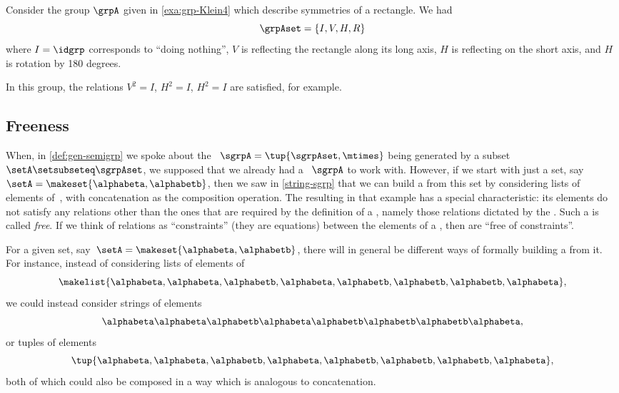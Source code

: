 \begin{example}
    Consider the group $\grpA$ given in \cref{exa:grp-Klein4} which describe symmetries of a rectangle.
    We had
    \begin{equation}
        \grpAset = \{ I, V, H, R\}
    \end{equation}
    where $I = \idgrp$ corresponds to ``doing nothing'', $V$ is reflecting the rectangle along its long axis, $H$ is reflecting on the short axis, and $H$ is rotation by 180 degrees.

    In this group, the relations $V^2 = I$, $H^2 = I$, $H^2 = I$ are satisfied, for example.
\end{example}

\subsection{Freeness}

When, in \cref{def:gen-semigrp} we spoke about the ~$\sgrpA = \tup{\sgrpAset, \mtimes}$  being generated by a subset~$\setA \setsubseteq \sgrpAset$, we supposed that we already had a ~$\sgrpA$ to work with.
However, if we start with just a set, say~$\setA = \makeset{ \alphabeta, \alphabetb}$, then we saw in \cref{string-sgrp} that we can build a  from this set by considering lists of elements of~\setA, with concatenation as the composition operation.
The resulting  in that example has a special characteristic: its elements do not satisfy any relations other than the ones that are required by the definition of a   , namely those relations dictated by the .
Such a  is called \emph{free}.
If we think of relations as ``constraints'' (they are equations) between the elements of a  , then  are ``free of constraints''.

For a given set, say~$\setA = \makeset{ \alphabeta, \alphabetb}$, there will in general be different ways of formally building a  from it.
For instance, instead of considering lists of elements of~\setA
\begin{equation}
    \makelist{\alphabeta,\alphabeta, \alphabetb, \alphabeta, \alphabetb, \alphabetb, \alphabetb, \alphabeta},
\end{equation}
we could instead consider strings of elements
\begin{equation}
    \alphabeta\alphabeta \alphabetb \alphabeta \alphabetb \alphabetb \alphabetb \alphabeta,
\end{equation}
or tuples of elements
\begin{equation}
    \tup{ \alphabeta, \alphabeta,  \alphabetb,  \alphabeta,  \alphabetb,  \alphabetb,  \alphabetb,  \alphabeta},
\end{equation}
both of which could also be composed in a way which is analogous to concatenation.

